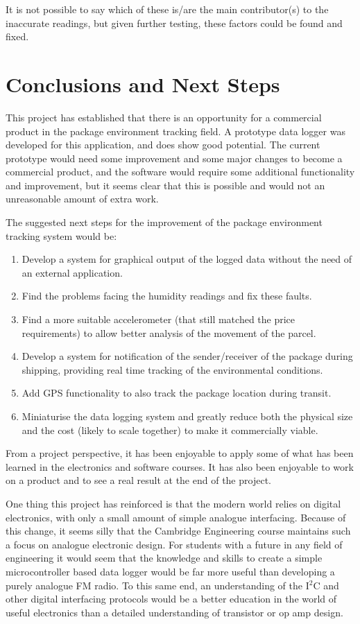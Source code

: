\documentclass[a4paper,10pt]{article}  %
\begin{document}
It is not possible to say which of these is/are the main
contributor(s) to the inaccurate readings, but given further testing,
these factors could be found and fixed.

\section{Conclusions and Next Steps}
\label{sec:concl-next-steps}

This project has established that there is an opportunity for a
commercial product in the package environment tracking field. A
prototype data logger was developed for this application, and does
show good potential. The current prototype would need some improvement
and some major changes to become a commercial product, and the
software would require some additional functionality and improvement,
but it seems clear that this is possible and would not an unreasonable
amount of extra work.

The suggested next steps for the improvement of the package
environment tracking system would be:
\begin{enumerate}
  \item Develop a system for graphical output of the logged data
    without the need of an external application.
  \item Find the problems facing the humidity readings and fix these
    faults.
  \item Find a more suitable accelerometer (that still matched the
    price requirements) to allow better analysis of the movement of
    the parcel.
  \item Develop a system for notification of the sender/receiver of
    the package during shipping, providing real time tracking of the
    environmental conditions.
  \item Add GPS functionality to also track the package location
    during transit.
  \item Miniaturise the data logging system and greatly reduce both
    the physical size and the cost (likely to scale together) to make
    it commercially viable.
\end{enumerate}

From a project perspective, it has been enjoyable to apply some of
what has been learned in the electronics and software courses. It has
also been enjoyable to work on a product and to see a real result at
the end of the project.

One thing this project has reinforced is that the modern world relies
on digital electronics, with only a small amount of simple analogue
interfacing. Because of this change, it seems silly that the Cambridge
Engineering course maintains such a focus on analogue electronic
design. For students with a future in any field of engineering it
would seem that the knowledge and skills to create a simple
microcontroller based data logger would be far more useful than
developing a purely analogue FM radio. To this same end, an
understanding of the I$^{\mathrm{2}}$C and other digital interfacing
protocols would be a better education in the world of useful
electronics than a detailed understanding of transistor or op amp
design.
\end{document}
